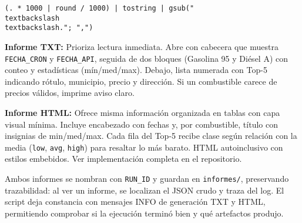 \texttt{(. * 1000 | round / 1000) | tostring | gsub("\\textbackslash\\textbackslash."; ",")}

\textbf{Informe TXT:} Prioriza lectura inmediata. Abre con cabecera que muestra \texttt{FECHA\_CRON} y \texttt{FECHA\_API}, seguida de dos bloques (Gasolina 95 y Diésel A) con conteo y estadísticas (mín/med/max). Debajo, lista numerada con Top-5 indicando rótulo, municipio, precio y dirección. Si un combustible carece de precios válidos, imprime aviso claro.

\textbf{Informe HTML:} Ofrece misma información organizada en tablas con capa visual mínima. Incluye encabezado con fechas y, por combustible, título con insignias de min/med/max. Cada fila del Top-5 recibe clase según relación con la media (\texttt{low}, \texttt{avg}, \texttt{high}) para resaltar lo más barato. HTML autoinclusivo con estilos embebidos. Ver implementación completa en el repositorio.

Ambos informes se nombran con \texttt{RUN\_ID} y guardan en \texttt{informes/}, preservando trazabilidad: al ver un informe, se localizan el JSON crudo y traza del log. El script deja constancia con mensajes INFO de generación TXT y HTML, permitiendo comprobar si la ejecución terminó bien y qué artefactos produjo.
